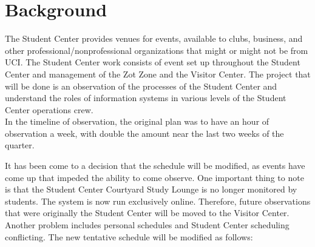 \documentclass[letterpaper, 12pt]{report}
\begin{document}
	\section{Background}
	The Student Center provides venues for events, available to clubs, business, and other professional/nonprofessional organizations that might or might not be from UCI. The Student Center work consists of event set up throughout the Student Center and management of the Zot Zone and the Visitor Center. The project that will be done is an observation of the processes of the Student Center and understand the roles of information systems in various levels of the Student Center operations crew.\\
	
	In the timeline of observation, the original plan was to have an hour of observation a week, with double the amount near the last two weeks of the quarter.
	
	\begin{chronology}[1]{2}{10}{\textwidth}[\textwidth]
	\end{chronology}
	
	It has been come to a decision that the schedule will be modified, as events have come up that impeded the ability to come observe. One important thing to note is that the Student Center Courtyard Study Lounge is no longer monitored by students. The system is now run exclusively online. Therefore, future observations that were originally the Student Center will be moved to the Visitor Center. Another problem includes personal schedules and Student Center scheduling conflicting. The new tentative schedule will be modified as follows:
	
	\begin{chronology}[1]{2}{10}{\textwidth}[\textwidth]
	\end{chronology}
	
\end{document}
